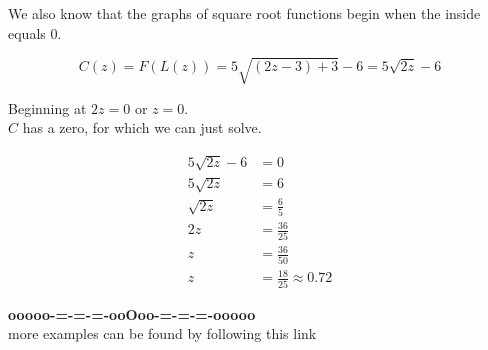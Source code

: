 \documentclass{ximera}
\begin{document}
\begin{example}
\begin{image}
\end{image}





We also know that the graphs of square root functions begin when the inside equals $0$. 

\[
C(z) = F(L(z)) = 5 \sqrt{(2z - 3) + 3} - 6 = 5 \sqrt{2z} - 6
\]


Beginning at $2z = 0$ or $z = 0$. \\

$C$ has a zero, for which we can just solve.




\begin{align*}
5 \sqrt{2z} - 6 &= 0 \\
5 \sqrt{2z}     &= 6 \\
\sqrt{2z}       &= \frac{6}{5} \\
2z            &= \frac{36}{25}  \\
z                  &= \frac{36}{50} \\
z                 &= \frac{18}{25} \approx 0.72
\end{align*}




\end{example}




















\begin{center}
\textbf{\textcolor{green!50!black}{ooooo-=-=-=-ooOoo-=-=-=-ooooo}} \\

more examples can be found by following this link\\ 

\end{center}
\end{document}
